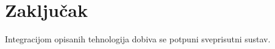 \chapter{Zaključak}


Integracijom opisanih tehnologija dobiva se potpuni sveprisutni sustav.

\eject